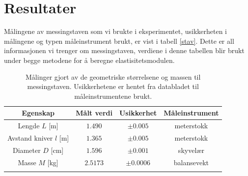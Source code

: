 \documentclass[%
 reprint,
 amsmath,amssymb,
 aps,
 norsk,
 booktabs
]{revtex4-1}
\begin{document}
\section{Resultater}
Målingene av messingstaven som vi brukte i eksperimentet, usikkerheten i målingene og typen måleinstrument brukt, er vist i tabell \vref{stav}. Dette er all informasjonen vi trenger om messingstaven, verdiene i denne tabellen blir brukt under begge metodene for å beregne elastisitetsmodulen.
\begin{table}[h!]
\centering
\caption{Målinger gjort av de geometriske størrelsene og massen til messingstaven. Usikkerhetene er hentet fra databladet til måleinstrumentene brukt.}
\label{stav}
\begin{tabular}{cccc}
    Egenskap & Målt verdi      &    Usikkerhet & Måleinstrument \\
    \toprule
    Lengde $L$ [m] & $1.490$    & $\pm 0.005$  & meterstokk  \\
    Avstand kniver $l$ [m] & $1.365$ & $\pm0.005$ & meterstokk \\
    Diameter $D$ [cm] & $1.596$    & $\pm0.001$ & skyvelær    \\
    Masse $M$    [kg]  & $2.5173$   & $\pm0.0006$   & balansevekt \\  \botrule
\end{tabular}
\end{table}
\end{document}
